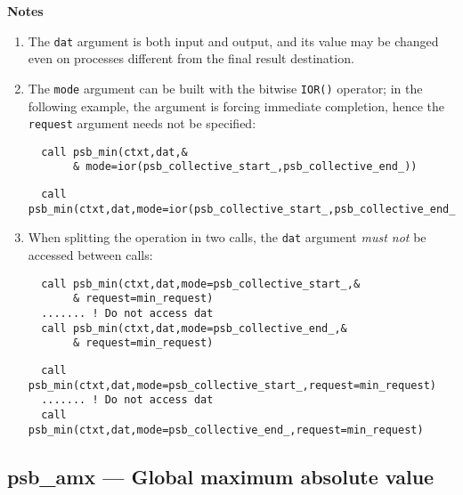 {\par\noindent\large\bfseries Notes}
\begin{enumerate}
\item The \verb|dat| argument is both input and output, and its
  value may be changed even on processes different from the final
  result destination.
\item The \verb|mode| argument can be built with the bitwise
  \verb|IOR()| operator; in the following example, the   argument is
  forcing immediate completion, hence the \verb|request| argument
  needs not be specified: 
\ifpdf
\begin{verbatim}
  call psb_min(ctxt,dat,&
       & mode=ior(psb_collective_start_,psb_collective_end_))
\end{verbatim}
\else
\begin{center}
    \begin{minipage}[tl]{0.9\textwidth}
\begin{verbatim} 
  call psb_min(ctxt,dat,mode=ior(psb_collective_start_,psb_collective_end_))
\end{verbatim}
    \end{minipage}
  \end{center}
\fi
  
\item When splitting the operation in two calls, the \verb|dat|
  argument  \emph{must not} be accessed between calls:
\ifpdf
\begin{verbatim}
  call psb_min(ctxt,dat,mode=psb_collective_start_,&
       & request=min_request)
  ....... ! Do not access dat 
  call psb_min(ctxt,dat,mode=psb_collective_end_,&
       & request=min_request)
\end{verbatim}
\else
\begin{center}
    \begin{minipage}[tl]{0.9\textwidth}
\begin{verbatim} 
  call psb_min(ctxt,dat,mode=psb_collective_start_,request=min_request)
  ....... ! Do not access dat 
  call psb_min(ctxt,dat,mode=psb_collective_end_,request=min_request)
\end{verbatim}
    \end{minipage}
  \end{center}
\fi
\end{enumerate}

\clearpage\subsection{psb\_amx --- Global maximum absolute value}

